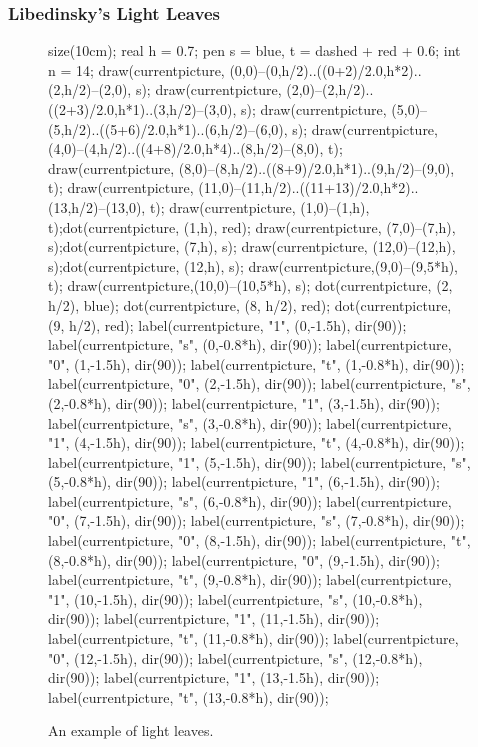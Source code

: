 \subsubsection{Libedinsky's Light Leaves}
\label{sec:prelim_lightleave}
\begin{figure}[ht]
	\centering
	\begin{asy}
	size(10cm);
	real h = 0.7;
	pen s = blue, t = dashed + red + 0.6;
	int n = 14;
	draw(currentpicture, (0,0)--(0,h/2)..((0+2)/2.0,h*2)..(2,h/2)--(2,0), s);
	draw(currentpicture, (2,0)--(2,h/2)..((2+3)/2.0,h*1)..(3,h/2)--(3,0), s);
	draw(currentpicture, (5,0)--(5,h/2)..((5+6)/2.0,h*1)..(6,h/2)--(6,0), s);
	draw(currentpicture, (4,0)--(4,h/2)..((4+8)/2.0,h*4)..(8,h/2)--(8,0), t);
	draw(currentpicture, (8,0)--(8,h/2)..((8+9)/2.0,h*1)..(9,h/2)--(9,0), t);
	draw(currentpicture, (11,0)--(11,h/2)..((11+13)/2.0,h*2)..(13,h/2)--(13,0), t);
	draw(currentpicture, (1,0)--(1,h), t);dot(currentpicture, (1,h), red);
	draw(currentpicture, (7,0)--(7,h), s);dot(currentpicture, (7,h), s);
	draw(currentpicture, (12,0)--(12,h), s);dot(currentpicture, (12,h), s);
	draw(currentpicture,(9,0)--(9,5*h), t);
	draw(currentpicture,(10,0)--(10,5*h), s);
	dot(currentpicture, (2, h/2), blue);
	dot(currentpicture, (8, h/2), red);
	dot(currentpicture, (9, h/2), red);
	label(currentpicture, "1", (0,-1.5h), dir(90));
	label(currentpicture, "s", (0,-0.8*h), dir(90));
	label(currentpicture, "0", (1,-1.5h), dir(90));
	label(currentpicture, "t", (1,-0.8*h), dir(90));
	label(currentpicture, "0", (2,-1.5h), dir(90));
	label(currentpicture, "s", (2,-0.8*h), dir(90));
	label(currentpicture, "1", (3,-1.5h), dir(90));
	label(currentpicture, "s", (3,-0.8*h), dir(90));
	label(currentpicture, "1", (4,-1.5h), dir(90));
	label(currentpicture, "t", (4,-0.8*h), dir(90));
	label(currentpicture, "1", (5,-1.5h), dir(90));
	label(currentpicture, "s", (5,-0.8*h), dir(90));
	label(currentpicture, "1", (6,-1.5h), dir(90));
	label(currentpicture, "s", (6,-0.8*h), dir(90));
	label(currentpicture, "0", (7,-1.5h), dir(90));
	label(currentpicture, "s", (7,-0.8*h), dir(90));
	label(currentpicture, "0", (8,-1.5h), dir(90));
	label(currentpicture, "t", (8,-0.8*h), dir(90));
	label(currentpicture, "0", (9,-1.5h), dir(90));
	label(currentpicture, "t", (9,-0.8*h), dir(90));
	label(currentpicture, "1", (10,-1.5h), dir(90));
	label(currentpicture, "s", (10,-0.8*h), dir(90));
	label(currentpicture, "1", (11,-1.5h), dir(90));
	label(currentpicture, "t", (11,-0.8*h), dir(90));
	label(currentpicture, "0", (12,-1.5h), dir(90));
	label(currentpicture, "s", (12,-0.8*h), dir(90));
	label(currentpicture, "1", (13,-1.5h), dir(90));
	label(currentpicture, "t", (13,-0.8*h), dir(90));
	\end{asy}
	\caption{An example of light leaves.}
	\label{fig:lightleaf_example}
\end{figure}

